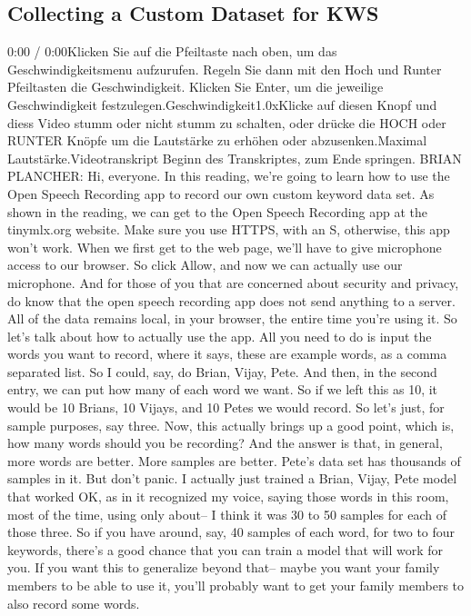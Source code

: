 \subsection{Collecting a Custom Dataset for KWS}

0:00 / 0:00Klicken Sie auf die Pfeiltaste nach oben, um das Geschwindigkeitsmenu aufzurufen. Regeln Sie dann mit den Hoch und Runter Pfeiltasten die Geschwindigkeit. Klicken Sie Enter, um die jeweilige Geschwindigkeit festzulegen.Geschwindigkeit1.0xKlicke auf diesen Knopf und diess Video stumm oder nicht stumm zu schalten, oder drücke die HOCH oder RUNTER Knöpfe um die Lautstärke zu erhöhen oder abzusenken.Maximal Lautstärke.Videotranskript
Beginn des Transkriptes, zum Ende springen.
BRIAN PLANCHER: Hi, everyone.
In this reading, we're going to learn how
to use the Open Speech Recording app to record our own custom keyword data set.
As shown in the reading, we can get to the Open Speech Recording app
at the tinymlx.org website.
Make sure you use HTTPS, with an S, otherwise, this app won't work.
When we first get to the web page, we'll have
to give microphone access to our browser.
So click Allow, and now we can actually use our microphone.
And for those of you that are concerned about security and privacy,
do know that the open speech recording app does not send anything to a server.
All of the data remains local, in your browser,
the entire time you're using it.
So let's talk about how to actually use the app.
All you need to do is input the words you
want to record, where it says, these are example words,
as a comma separated list.
So I could, say, do Brian, Vijay, Pete.
And then, in the second entry, we can put how many of each word we want.
So if we left this as 10, it would be 10 Brians, 10 Vijays,
and 10 Petes we would record.
So let's just, for sample purposes, say three.
Now, this actually brings up a good point,
which is, how many words should you be recording?
And the answer is that, in general, more words are better.
More samples are better.
Pete's data set has thousands of samples in it.
But don't panic.
I actually just trained a Brian, Vijay, Pete model
that worked OK, as in it recognized my voice, saying
those words in this room, most of the time, using only about--
I think it was 30 to 50 samples for each of those three.
So if you have around, say, 40 samples of each word, for two to four keywords,
there's a good chance that you can train a model that will work for you.
If you want this to generalize beyond that--
maybe you want your family members to be able to use it,
you'll probably want to get your family members to also record some words.
